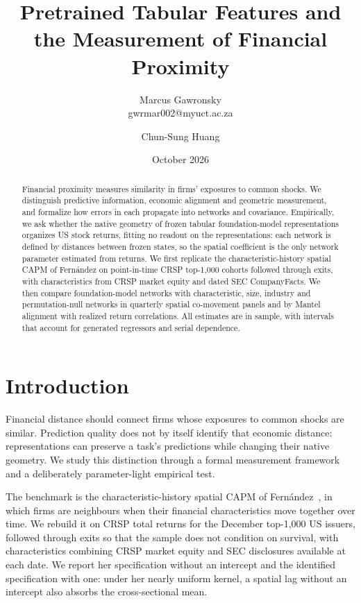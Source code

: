 \documentclass[11pt]{article}
\title{Pretrained Tabular Features and the Measurement of Financial Proximity}
\author{Marcus Gawronsky\\\small gwrmar002@myuct.ac.za
\and Chun-Sung Huang}
\date{October 2026}
\begin{document}
\maketitle
\begin{abstract}
  Financial proximity measures similarity in firms' exposures to common shocks.
  We distinguish predictive information, economic alignment and geometric
  measurement, and formalize how errors in each propagate into networks and
  covariance. Empirically, we ask whether the native geometry of frozen tabular
  foundation-model representations organizes US stock returns,
  fitting no readout
  on the representations: each network is defined by distances between frozen
  states, so the spatial coefficient is the only network parameter
  estimated from
  returns. We first replicate the characteristic-history spatial CAPM of
  Fern\'andez on point-in-time CRSP top-1,000 cohorts followed
  through exits, with
  characteristics from CRSP market equity and dated SEC CompanyFacts. We then
  compare foundation-model networks with characteristic, size, industry and
  permutation-null networks in quarterly spatial co-movement panels
  and by Mantel
  alignment with realized return correlations. All estimates are in sample, with
  intervals that account for generated regressors and serial dependence.
\end{abstract}

\section{Introduction}\label{sec:question}
Financial distance should connect firms whose exposures to common shocks are
similar. Prediction quality does not by itself identify that economic distance:
representations can preserve a task's predictions while changing their native
geometry. We study this distinction through a formal measurement framework and a
deliberately parameter-light empirical test.

The benchmark is the characteristic-history spatial CAPM of
Fern\'andez~\cite{fernandez2011}, in which firms are neighbours when their
financial characteristics move together over time. We rebuild it on CRSP total
returns for the December top-1,000 US issuers, followed through exits
so that the
sample does not condition on survival, with characteristics combining
CRSP market
equity and SEC disclosures available at each date. We report her specification
without an intercept and the identified specification with one: under her nearly
uniform kernel, a spatial lag without an intercept also absorbs the
cross-sectional mean.
\end{document}
